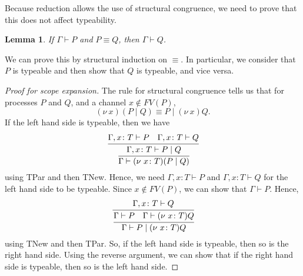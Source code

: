 \documentclass[a4paper, openany]{memoir}
\newtheorem{lemma}[proposition]{Lemma}
\theoremstyle{definition}
\begin{document}
    Because reduction allows the use of structural congruence, we need to prove that this does not affect typeability.
    \begin{lemma}
        If $\Gamma \vdash P$ and $P \equiv Q$, then $\Gamma \vdash Q$.
    \end{lemma}
    \noindent We can prove this by structural induction on $\equiv$. In particular, we consider that $P$ is typeable and then show that $Q$ is typeable, and vice versa.
    \begin{proof}[Proof for scope expansion]
        The rule for structural congruence tells us that for processes $P$ and $Q$, and a channel $x \not\in FV(P)$,
        \[(\nu \ x)(P \mid Q) \equiv P \mid (\nu \ x)Q.\]
        If the left hand side is typeable, then we have
        \[\cfrac{\Gamma, x \colon T \vdash P \quad \Gamma, x \colon T \vdash Q}{\cfrac{\Gamma, x \colon T \vdash P \mid Q}{\Gamma \vdash (\nu \ x \colon T)(P \mid Q)}}\]
        using TPar and then TNew. Hence, we need $\Gamma, x \colon T \vdash P$ and $\Gamma, x \colon T \vdash Q$ for the left hand side to be typeable. Since $x \not\in FV(P)$, we can show that $\Gamma \vdash P$. Hence,
        \[\cfrac{\Gamma, x \colon T \vdash Q}{\cfrac{\Gamma \vdash P \quad \Gamma \vdash (\nu \ x \colon T)Q}{\Gamma \vdash P \mid (\nu \ x \colon T)Q}}\]
        using TNew and then TPar. So, if the left hand side is typeable, then so is the right hand side. Using the reverse argument, we can show that if the right hand side is typeable, then so is the left hand side.
    \end{proof}
\end{document}
